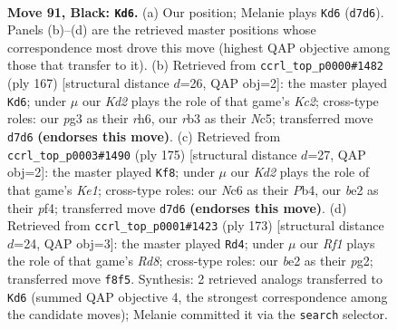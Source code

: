 \documentclass[11pt]{article}
\begin{document}
\clearpage

\begin{figure}[p]\centering
\begin{subfigure}{0.46\textwidth}\centering
\resizebox{\linewidth}{!}{%
\newchessgame
\chessboard[
  setfen={5r2/3k4/P1n5/8/8/1R4PP/2PKB3/8 b - - 16 91},
  showmover=false,
  pgfstyle=straightmove, color=movearrow, markmove={d7-d6}
]}
\caption{}
\end{subfigure}\hfill
\begin{subfigure}{0.46\textwidth}\centering
\resizebox{\linewidth}{!}{%
\newchessgame
\chessboard[
  setfen={3n4/2k5/1p3P1R/2nB4/2P5/2P5/2K2P2/8 b - - 0 84},
  showmover=false,
  pgfstyle=straightmove, color=movearrow, markmove={c7-d6}
]}
\caption{}
\end{subfigure}
\\[4pt]
\begin{subfigure}{0.46\textwidth}\centering
\resizebox{\linewidth}{!}{%
\newchessgame
\chessboard[
  setfen={4k3/5p2/4r3/8/1p3PP1/1P3K2/P2R4/8 b - - 1 88},
  showmover=false,
  pgfstyle=straightmove, color=movearrow, markmove={e8-f8}
]}
\caption{}
\end{subfigure}\hfill
\begin{subfigure}{0.46\textwidth}\centering
\resizebox{\linewidth}{!}{%
\newchessgame
\chessboard[
  setfen={8/8/R7/4nk2/8/7P/6PK/3r4 b - - 12 87},
  showmover=false,
  pgfstyle=straightmove, color=movearrow, markmove={d1-d4}
]}
\caption{}
\end{subfigure}
\caption{\textbf{Move 91, Black: \texttt{Kd6}.} (a) Our position; Melanie plays \texttt{Kd6} (\texttt{d7d6}). Panels (b)--(d) are the retrieved master positions whose correspondence most drove this move (highest QAP objective among those that transfer to it). (b) Retrieved from \texttt{ccrl\_top\_p0000\#1482} (ply 167) [structural distance $d$=26, QAP obj=2]: the master played \texttt{Kd6}; under $\mu$ our \emph{Kd2} plays the role of that game's \emph{Kc2}; cross-type roles: our \emph{p}g3 as their \emph{r}h6, our \emph{r}b3 as their \emph{N}c5; transferred move \texttt{d7d6} \textbf{(endorses this move)}. (c) Retrieved from \texttt{ccrl\_top\_p0003\#1490} (ply 175) [structural distance $d$=27, QAP obj=2]: the master played \texttt{Kf8}; under $\mu$ our \emph{Kd2} plays the role of that game's \emph{Ke1}; cross-type roles: our \emph{N}c6 as their \emph{P}b4, our \emph{b}e2 as their \emph{p}f4; transferred move \texttt{d7d6} \textbf{(endorses this move)}. (d) Retrieved from \texttt{ccrl\_top\_p0001\#1423} (ply 173) [structural distance $d$=24, QAP obj=3]: the master played \texttt{Rd4}; under $\mu$ our \emph{Rf1} plays the role of that game's \emph{Rd8}; cross-type roles: our \emph{b}e2 as their \emph{p}g2; transferred move \texttt{f8f5}. Synthesis: 2 retrieved analogs transferred to \texttt{Kd6} (summed QAP objective 4, the strongest correspondence among the candidate moves); Melanie committed it via the \texttt{search} selector.}
\label{fig:thought-m181}
\end{figure}
\end{document}

